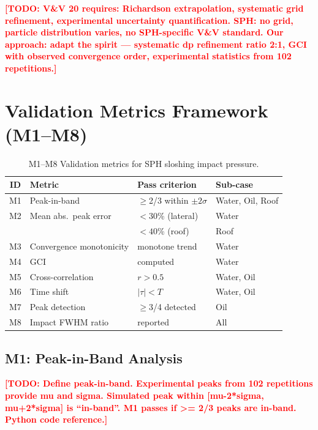 \documentclass[twocolumn]{svjour3}
\newcommand{\TODO}[1]{\textcolor{red}{\textbf{[TODO: #1]}}}
\begin{document}
\TODO{V\&V 20 requires: Richardson extrapolation, systematic grid refinement,
experimental uncertainty quantification. SPH: no grid, particle distribution
varies, no SPH-specific V\&V standard. Our approach: adapt the spirit ---
systematic dp refinement ratio 2:1, GCI with observed convergence order,
experimental statistics from 102 repetitions.}


\section{Validation Metrics Framework (M1--M8)}
\label{sec:metrics}

\begin{table}[t]
\caption{M1--M8 Validation metrics for SPH sloshing impact pressure.}
\label{tab:metrics-def}
\centering
\small
\begin{tabular}{@{}clll@{}}
\toprule
ID & Metric & Pass criterion & Sub-case \\
\midrule
M1 & Peak-in-band & $\geq$2/3 within $\pm 2\sigma$ & Water, Oil, Roof \\
M2 & Mean abs.\ peak error & $<30$\% (lateral) & Water \\
   &                       & $<40$\% (roof) & Roof \\
M3 & Convergence monotonicity & monotone trend & Water \\
M4 & GCI & computed & Water \\
M5 & Cross-correlation & $r > 0.5$ & Water, Oil \\
M6 & Time shift & $|\tau| < T$ & Water, Oil \\
M7 & Peak detection & $\geq$3/4 detected & Oil \\
M8 & Impact FWHM ratio & reported & All \\
\bottomrule
\end{tabular}
\end{table}

\subsection{M1: Peak-in-Band Analysis}
\label{sec:m1}

\TODO{Define peak-in-band. Experimental peaks from 102 repetitions provide
mu and sigma. Simulated peak within [mu-2*sigma, mu+2*sigma] is ``in-band''.
M1 passes if >= 2/3 peaks are in-band. Python code reference.}
\end{document}
